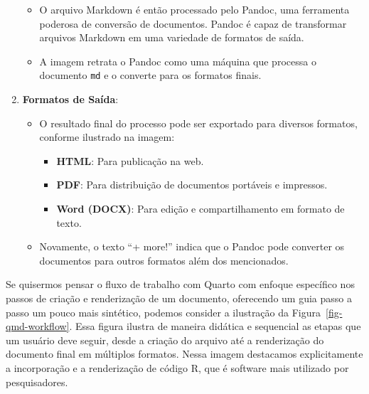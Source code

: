 \documentclass[
  a4paper,
]{article}
\providecommand{\tightlist}{%
  \setlength{\itemsep}{0pt}\setlength{\parskip}{0pt}}\usepackage{longtable,booktabs,array}
\begin{document}
\begin{tcolorbox}
\begin{enumerate}
  \begin{itemize}
  \tightlist
  \item
    O arquivo Markdown é então processado pelo Pandoc, uma ferramenta
    poderosa de conversão de documentos. Pandoc é capaz de transformar
    arquivos Markdown em uma variedade de formatos de saída.
  \item
    A imagem retrata o Pandoc como uma máquina que processa o documento
    \texttt{md} e o converte para os formatos finais.
  \end{itemize}
\item
  \textbf{Formatos de Saída}:

  \begin{itemize}
  \tightlist
  \item
    O resultado final do processo pode ser exportado para diversos
    formatos, conforme ilustrado na imagem:

    \begin{itemize}
    \tightlist
    \item
      \textbf{HTML}: Para publicação na web.
    \item
      \textbf{PDF}: Para distribuição de documentos portáveis e
      impressos.
    \item
      \textbf{Word (DOCX)}: Para edição e compartilhamento em formato de
      texto.
    \end{itemize}
  \item
    Novamente, o texto ``+ more!'' indica que o Pandoc pode converter os
    documentos para outros formatos além dos mencionados.
  \end{itemize}
\end{enumerate}

\end{tcolorbox}

Se quisermos pensar o fluxo de trabalho com Quarto com enfoque
específico nos passos de criação e renderização de um documento,
oferecendo um guia passo a passo um pouco mais sintético, podemos
consider a ilustração da Figura~\ref{fig-qmd-workflow}. Essa figura
ilustra de maneira didática e sequencial as etapas que um usuário deve
seguir, desde a criação do arquivo até a renderização do documento final
em múltiplos formatos. Nessa imagem destacamos explicitamente a
incorporação e a renderização de código R, que é software mais utilizado
por pesquisadores.
\end{document}
